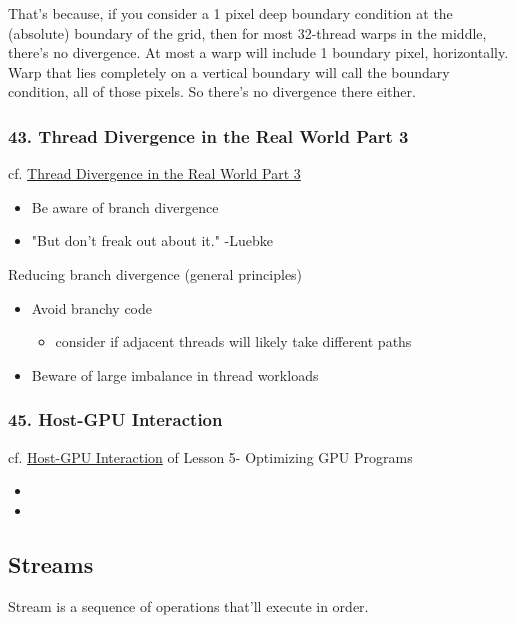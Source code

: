 \documentclass[10pt]{amsart}
\begin{document}
\begin{multicols*}{2}
That's because, if you consider a 1 pixel deep boundary condition at the (absolute) boundary of the grid, then for most 32-thread warps in the middle, there's no divergence.  At most a warp will include 1 boundary pixel, horizontally.  Warp that lies completely on a vertical boundary will call the boundary condition, all of those pixels.  So there's no divergence there either.  

 \subsubsection{43. Thread Divergence in the Real World Part 3}
cf. \href{https://classroom.udacity.com/courses/cs344/lessons/109244577/concepts/1100476720923}{Thread Divergence in the Real World Part 3} 
\begin{itemize}
\item Be aware of branch divergence
\item "But don't freak out about it." -Luebke
\end{itemize}

Reducing branch divergence (general principles)
\begin{itemize}
\item Avoid branchy code 
\begin{itemize}
\item consider if adjacent threads will likely take different paths
\end{itemize}
\item Beware of large imbalance in thread workloads
\end{itemize}

\subsubsection{45. Host-GPU Interaction}
cf. \href{https://classroom.udacity.com/courses/cs344/lessons/109244577/concepts/1109306840923}{Host-GPU Interaction} of Lesson 5- Optimizing GPU Programs

\begin{itemize}
\item 
\item
\end{itemize}

\subsection{Streams}

Stream is a sequence of operations that'll execute in order.  


\end{multicols*}
\end{document}

